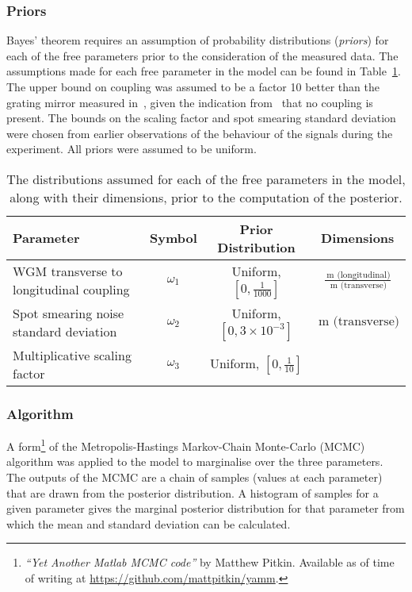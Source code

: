 \subsubsection{Priors}
Bayes' theorem requires an assumption of probability distributions (\emph{priors}) for each of the free parameters prior to the consideration of the measured data. The assumptions made for each free parameter in the model can be found in Table~\ref{tab:priors}. The upper bound on coupling was assumed to be a factor \num{10} better than the grating mirror measured in~\cite{Barr2011}, given the indication from~\cite{Brown2013} that no coupling is present. The bounds on the scaling factor and spot smearing standard deviation were chosen from earlier observations of the behaviour of the signals during the experiment. All priors were assumed to be uniform.

\begin{table}
  \centering
  \begin{tabular}{|p{3cm}|c|c|c|}
    \hline
    \textbf{Parameter}   & \textbf{Symbol}     & \textbf{Prior Distribution} & \textbf{Dimensions} \\ \hline
    \gls{WGM} transverse to longitudinal coupling & $\omega_1$ & Uniform, $\left[ 0, \frac{1}{1000} \right]$ & $\frac{\SI{}{\meter} \text{ (longitudinal)}}{\SI{}{\meter} \text{ (transverse)}}$ \\ \hline
    Spot smearing noise standard deviation & $\omega_2$ & Uniform, $\left[ 0, 3 \times 10^{-3} \right]$ & $\SI{}{\meter} \text{ (transverse)}$ \\ \hline
    Multiplicative scaling factor                    & $\omega_3$ & Uniform, $\left[ 0, \frac{1}{10} \right]$ &  \\ \hline
  \end{tabular}
  \caption[Distributions assumed for each of the free parameters in the waveguide model]{\label{tab:priors}The distributions assumed for each of the free parameters in the model, along with their dimensions, prior to the computation of the posterior.}
\end{table}

\subsubsection{Algorithm}
A form\footnote{\emph{``Yet Another Matlab MCMC code''} by Matthew Pitkin. Available as of time of writing at \url{https://github.com/mattpitkin/yamm}.} of the Metropolis-Hastings Markov-Chain Monte-Carlo (MCMC) algorithm \cite{Hastings1970} was applied to the model to marginalise over the three parameters. The outputs of the MCMC are a chain of samples (values at each parameter) that are drawn from the posterior distribution. A histogram of samples for a given parameter gives the marginal posterior distribution for that parameter from which the mean and standard deviation can be calculated.

